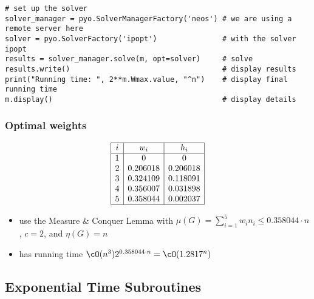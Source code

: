 \begin{frame}
{\begin{verbatim}
# set up the solver
solver_manager = pyo.SolverManagerFactory('neos') # we are using a remote server here
solver = pyo.SolverFactory('ipopt')               # with the solver ipopt
results = solver_manager.solve(m, opt=solver)     # solve
results.write()                                   # display results
print("Running time: ", 2**m.Wmax.value, "^n")    # display final running time
m.display()                                       # display details
\end{verbatim}	
}
\end{frame}

\begin{frame}
 \frametitle{Optimal weights}
 
 \[
 \begin{array}{|c|c|c|}
  \hline
  i & w_i & h_i\\
  \hline
  1 & 0 & 0\\
  2 & 0.206018 & 0.206018\\
  3 & 0.324109 & 0.118091\\
  4 & 0.356007 & 0.031898\\
  5 & 0.358044 & 0.002037\\
  \hline
 \end{array}
 \]
 
 \begin{itemize}
  \item use the Measure \& Conquer Lemma with $\mu(G) = \sum_{i=1}^5 w_i n_i \le 0.358044 \cdot n $, $c=2$, and $\eta(G)=n$
  \item \algmis has running time $\cO(n^3) 2^{0.358044 \cdot n} = \cO(1.2817^n)$
 \end{itemize}
 
\end{frame}


\subsection{Exponential Time Subroutines}


